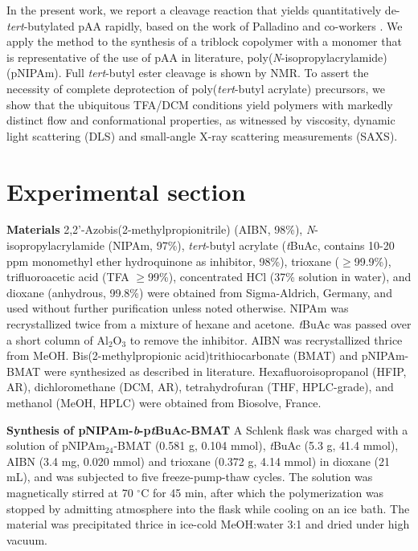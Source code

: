 \documentclass{article}
\begin{document}
In the present work, we report a cleavage reaction that yields quantitatively de-\emph{
tert}-butylated pAA rapidly, based on the work of 
Palladino and co-workers \cite{Palladino2012}. We apply the method to the synthesis of a 
triblock copolymer with a monomer that is representative \cite{Lue2011, Schilli2004a}
of the use of pAA in literature, poly(\emph{N}-iso\-propyl\-acryl\-amide) (pNIPAm). Full 
\emph{tert}-butyl ester cleavage is shown
by NMR. To assert the necessity of complete deprotection of poly(\emph{tert}-butyl acrylate) precursors, we show that the ubiquitous 
TFA/DCM conditions yield polymers with markedly distinct flow and conformational properties, as witnessed by viscosity,
dynamic light scattering (DLS) and small-angle X-ray scattering measurements (SAXS).

\section*{Experimental section}
\textbf{Materials}
2,2'-Azobis(2-methylpropionitrile) (AIBN, 98\%), \emph{N}-iso\-propyl\-acryl\-amide (NIPAm,  97\%), \emph{tert}-butyl acrylate (\emph{t}BuAc, 
contains 10-20 ppm mono\-methyl ether hydro\-quinone as inhibitor, 98\%), trioxane ($\geqslant$99.9\%), tri\-fluoro\-acetic acid (TFA $\geqslant$99\%), 
concentrated HCl (37\% solution in water), and dioxane (anhydrous, 99.8\%) were obtained from Sigma-Aldrich, Germany, and used without further purification 
unless noted otherwise. NIPAm was recrystallized twice from a mixture of hexane and acetone. \emph{t}BuAc was passed over a short column of Al$_2$O$_3$ to
remove the inhibitor. AIBN was recrystallized thrice from MeOH. Bis(2-methylpropionic acid)trithiocarbonate \cite{Lai2002a, Cetintas2017} (BMAT) and
pNIPAm-BMAT \cite{Cetintas2017} were synthesized as described in literature.
Hexafluoroisopropanol (HFIP, AR), dichloro\-methane (DCM, AR), tetra\-hydro\-furan (THF, HPLC-grade), and meth\-anol (MeOH, HPLC) were 
obtained from Biosolve, France.

\textbf{Synthesis of pNIPAm-\emph{b}-p\emph{t}BuAc-BMAT}
A Schlenk flask was charged with a solution of pNIPAm$_\mathrm{24}$-BMAT (0.581 g, 0.104 mmol), \emph{t}BuAc (5.3 g, 41.4 mmol), 
AIBN (3.4 mg, 0.020 mmol) and trioxane (0.372 g, 4.14 mmol) in dioxane (21 mL), and was subjected
to five freeze-pump-thaw cycles. The solution was magnetically stirred at 70 $^\circ \mathrm{C}$ for 45 min, 
after which the polymerization was stopped by admitting atmosphere into the flask while cooling on an ice bath.
The material was precipitated thrice in ice-cold MeOH:water 3:1 and dried under high vacuum.
\end{document}

